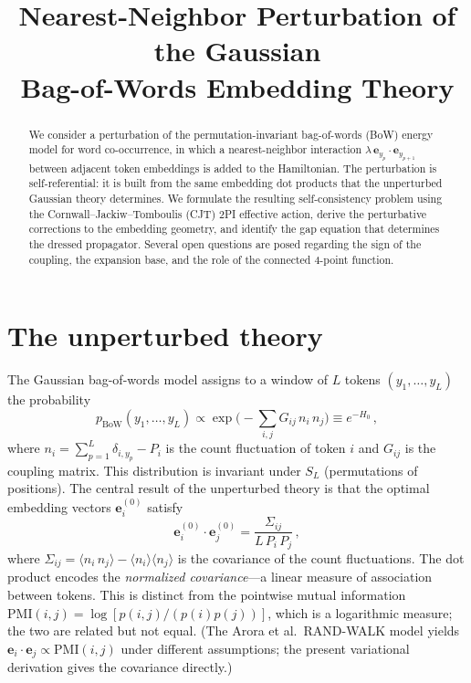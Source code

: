 \documentclass[11pt]{article}
\title{Nearest-Neighbor Perturbation of the Gaussian\\Bag-of-Words Embedding Theory}
\author{}
\date{}
\newcommand{\ee}{\bm{e}}
\newcommand{\PMI}{\mathrm{PMI}}
\newcommand{\BoW}{\mathrm{BoW}}
\begin{document}
\maketitle

\begin{abstract}
We consider a perturbation of the permutation-invariant bag-of-words (BoW) energy model for word co-occurrence, in which a nearest-neighbor interaction $\lambda\, \ee_{y_p} \cdot \ee_{y_{p+1}}$ between adjacent token embeddings is added to the Hamiltonian. The perturbation is self-referential: it is built from the same embedding dot products that the unperturbed Gaussian theory determines. We formulate the resulting self-consistency problem using the Cornwall--Jackiw--Tomboulis (CJT) 2PI effective action, derive the perturbative corrections to the embedding geometry, and identify the gap equation that determines the dressed propagator. Several open questions are posed regarding the sign of the coupling, the expansion base, and the role of the connected 4-point function.
\end{abstract}

\tableofcontents

\section{The unperturbed theory}\label{sec:unperturbed}

The Gaussian bag-of-words model assigns to a window of $L$ tokens $(y_1, \ldots, y_L)$ the probability
\begin{equation}\label{eq:H0}
    p_{\BoW}(y_1, \ldots, y_L) \propto \exp\!\Big(-\sum_{i,j} G_{ij}\, n_i\, n_j\Big) \equiv e^{-H_0}\,,
\end{equation}
where $n_i = \sum_{p=1}^L \delta_{i, y_p} - P_i$ is the count fluctuation of token $i$ and $G_{ij}$ is the coupling matrix. This distribution is invariant under $S_L$ (permutations of positions). The central result of the unperturbed theory is that the optimal embedding vectors $\ee_i^{(0)}$ satisfy
\begin{equation}\label{eq:bow-cov}
    \ee_i^{(0)} \cdot \ee_j^{(0)} = \frac{\Sigma_{ij}}{L\, P_i\, P_j}\,,
\end{equation}
where $\Sigma_{ij} = \langle n_i\, n_j \rangle - \langle n_i \rangle \langle n_j \rangle$ is the covariance of the count fluctuations. The dot product encodes the \emph{normalized covariance}---a linear measure of association between tokens. This is distinct from the pointwise mutual information $\PMI(i,j) = \log[p(i,j)/(p(i)p(j))]$, which is a logarithmic measure; the two are related but not equal. (The Arora et al.\ RAND-WALK model yields $\ee_i \cdot \ee_j \propto \PMI(i,j)$ under different assumptions; the present variational derivation gives the covariance directly.)
\end{document}
